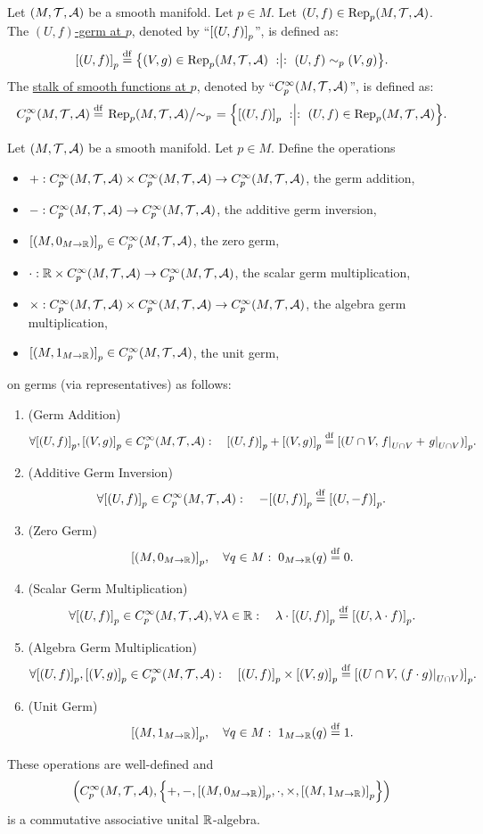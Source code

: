 \documentclass[11pt,reqno]{amsart}
\newcommand{\Rep}{\mathrm{Rep}}
\begin{document}
\begin{Def}
Let $(M,\mathcal{T},\mathcal{A})$ be a smooth manifold. Let $p\in M$.
Let $(U,f)\in\Rep_p(M,\T,\A)$.
The \ul{$(U,f)$-germ at $p$}, denoted by ``$\SqBr{(U,f)}_p$'', is defined as:
\[
\SqBr{(U,f)}_p\df\set{(V,g)\in\Rep_p(M,\T,\A)\st
(U,f)\sim_p(V,g)
}.
\]
The \ul{stalk of smooth functions at $p$}, denoted by
``$C_p^\infty(M,\mathcal{T},\mathcal{A})$'', is defined as:
\[
C_p^\infty(M,\T,\A)\df
\left.\Rep_p(M,\T,\A)\middle/\sim_p\right.
=\set{\SqBr{(U,f)}_p\st(U,f)\in\Rep_p(M,\T,\A)}.
\]
\end{Def}

\begin{Thm}\label{thm:stalk-algebra}
Let $(M,\mathcal{T},\mathcal{A})$ be a smooth manifold. Let $p\in M$.
Define the operations
\begin{itemize}
\item $+:C_p^\infty(M,\mathcal{T},\mathcal{A})\times C_p^\infty(M,\mathcal{T},\mathcal{A})\to C_p^\infty(M,\mathcal{T},\mathcal{A})$,
  the germ addition,
\item $-:C_p^\infty(M,\mathcal{T},\mathcal{A})\to C_p^\infty(M,\mathcal{T},\mathcal{A})$,
  the additive germ inversion,
\item $\SqBr{\Br{M,0_{M\to\R}}}_p\in C_p^\infty(M,\T,\A)$,
  the zero germ,
\item $\cdot:\mathbb{R}\times C_p^\infty(M,\mathcal{T},\mathcal{A})\to C_p^\infty(M,\mathcal{T},\mathcal{A})$,
  the scalar germ multiplication,
\item $\times:C_p^\infty(M,\mathcal{T},\mathcal{A})\times C_p^\infty(M,\mathcal{T},\mathcal{A})\to C_p^\infty(M,\mathcal{T},\mathcal{A})$,
  the algebra germ multiplication,
\item $\SqBr{\Br{M,1_{M\to\R}}}_p\in C_p^\infty(M,\T,\A)$,
  the unit germ,
\end{itemize}
on germs (via representatives) as follows:
\begin{enumerate}
\item (Germ Addition)
  \[\forall \SqBr{(U,f)}_p,\SqBr{(V,g)}_p\in C_p^\infty(M,\T,\A):\quad
  \SqBr{(U,f)}_p+\SqBr{(V,g)}_p\df\SqBr{\Br{U\cap V,\eval{f}_{U\cap V}
+\eval{g}_{U\cap V}}}_p.\]
\item (Additive Germ Inversion)
  \[\forall \SqBr{(U,f)}_p\in C_p^\infty(M,\T,\A):\quad
  -\SqBr{(U,f)}_p\df\SqBr{(U,-f)}_p.\]
\item (Zero Germ)
  \[\SqBr{\Br{M,0_{M\to\R}}}_p,\quad
  \forall q\in M:\;0_{M\to\R}(q)\df0.\]
\item (Scalar Germ Multiplication)
  \[\forall \SqBr{(U,f)}_p\in C_p^\infty(M,\T,\A),\forall\lambda\in\R:\quad
  \lambda\cdot\SqBr{(U,f)}_p\df\SqBr{(U,\lambda\cdot f)}_p.\]
\item (Algebra Germ Multiplication)
  \[\forall \SqBr{(U,f)}_p,\SqBr{(V,g)}_p\in C_p^\infty(M,\T,\A):\quad
  \SqBr{(U,f)}_p\times\SqBr{(V,g)}_p\df\SqBr{\Br{U\cap V,
\eval{(f\cdot g)}_{U\cap V}}}_p.\]
\item (Unit Germ)
  \[\SqBr{\Br{M,1_{M\to\R}}}_p,\quad
  \forall q\in M:\;1_{M\to\R}(q)\df1.\]
\end{enumerate}
These operations are well-defined and
\[\Br{C_p^\infty(M,\T,\A),\set{+,-,\SqBr{\Br{M,0_{M\to\R}}}_p,\cdot,\times,\SqBr{\Br{M,1_{M\to\R}}}_p}}\]
is a commutative associative unital $\mathbb{R}$-algebra.
\end{Thm}
\end{document}
